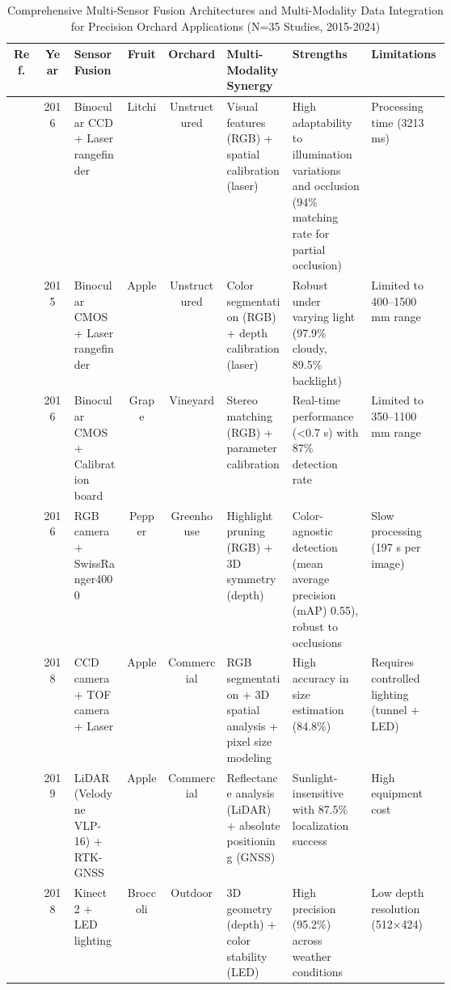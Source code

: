 \documentclass{ieeeaccess}
\begin{document}
\begin{table}[ht]
\footnotesize
\centering
\caption{Comprehensive Multi-Sensor Fusion Architectures and Multi-Modality Data Integration for Precision Orchard Applications (N=35 Studies, 2015-2024)} 
\label{tab:dataset}
\renewcommand{\arraystretch}{1.2}
\begin{tabularx}{\textwidth}{cc>{\raggedright\arraybackslash}m{0.12\linewidth}cc>{\raggedright\arraybackslash}m{0.15\linewidth}>{\raggedright\arraybackslash}m{0.18\linewidth}>{\raggedright\arraybackslash}m{0.18\linewidth}}
\hline
\textbf{Ref.} & \textbf{Year} & \textbf{Sensor Fusion} & \textbf{Fruit} & \textbf{Orchard} & \textbf{Multi-Modality Synergy} & \textbf{Strengths} & \textbf{Limitations} \\ 
\hline
\cite{wang2016localisation} & 2016 & Binocular CCD + Laser rangefinder & Litchi & Unstructured & Visual features (RGB) + spatial calibration (laser) & High adaptability to illumination variations and occlusion (94\% matching rate for partial occlusion) & Processing time (3213 ms) \\ 
\hline
\cite{si2015location} & 2015 & Binocular CMOS + Laser rangefinder & Apple & Unstructured & Color segmentation (RGB) + depth calibration (laser) & Robust under varying light (97.9\% cloudy, 89.5\% backlight) & Limited to 400–1500 mm range  \\ 
\hline
\cite{luo2016vision} & 2016 & Binocular CMOS + Calibration board & Grape & Vineyard & Stereo matching (RGB) + parameter calibration & Real-time performance (<0.7 s) with 87\% detection rate & Limited to 350–1100 mm range  \\ 
\hline
\cite{barnea2016colour} & 2016 & RGB camera + SwissRanger4000 & Pepper & Greenhouse & Highlight pruning (RGB) + 3D symmetry (depth) & Color-agnostic detection (mean average precision (mAP) 0.55), robust to occlusions & Slow processing (197 s per image)  \\ 
\hline
\cite{gongal2018apple} & 2018 & CCD camera + TOF camera + Laser & Apple & Commercial & RGB segmentation + 3D spatial analysis + pixel size modeling & High accuracy in size estimation (84.8\%) & Requires controlled lighting (tunnel + LED) \\ 
\hline
\cite{gene2019fruit} & 2019 & LiDAR (Velodyne VLP-16) + RTK-GNSS & Apple & Commercial & Reflectance analysis (LiDAR) + absolute positioning (GNSS) & Sunlight-insensitive with 87.5\% localization success & High equipment cost  \\ 
\hline
\cite{kusumam20173d} & 2018 & Kinect 2 + LED lighting & Broccoli & Outdoor & 3D geometry (depth) + color stability (LED) & High precision (95.2\%) across weather conditions & Low depth resolution (512×424)  \\ 

\end{tabularx}
\end{table}
\end{document}
